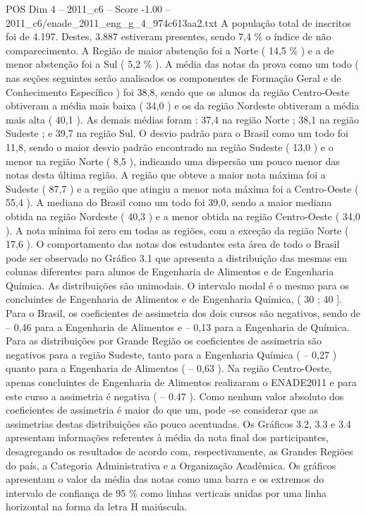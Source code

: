 \begin{textsample}{POS Dim 4 – 2011\_c6 – Score -1.00 – 2011\_c6/enade\_2011\_eng\_g\_4\_974c613aa2.txt}
A população total de inscritos foi de 4.197.
Destes, 3.887 estiveram presentes, sendo 7,4 \% o índice de não comparecimento.
A Região de maior abstenção foi a Norte ( 14,5 \% ) e a de menor abstenção foi a Sul ( 5,2 \% ).
A média das notas da prova como um todo ( nas seções seguintes serão analisados os componentes de Formação Geral e de Conhecimento Específico ) foi 38,8, sendo que os alunos da região Centro-Oeste obtiveram a média mais baixa ( 34,0 ) e os da região Nordeste obtiveram a média mais alta ( 40,1 ).
As demais médias foram : 37,4 na região Norte ; 38,1 na região Sudeste ; e 39,7 na região Sul.
O desvio padrão para o Brasil como um todo foi 11,8, sendo o maior desvio padrão encontrado na região Sudeste ( 13,0 ) e o menor na região Norte ( 8,5 ), indicando uma dispersão um pouco menor das notas desta última região.
A região que obteve a maior nota máxima foi a Sudeste ( 87,7 ) e a região que atingiu a menor nota máxima foi a Centro-Oeste ( 55,4 ).
A mediana do Brasil como um todo foi 39,0, sendo a maior mediana obtida na região Nordeste ( 40,3 ) e a menor obtida na região Centro-Oeste ( 34,0 ).
A nota mínima foi zero em todas as regiões, com a exceção da região Norte ( 17,6 ).
O comportamento das notas dos estudantes esta área de todo o Brasil pode ser observado no Gráfico 3.1 que apresenta a distribuição das mesmas em colunas diferentes para alunos de Engenharia de Alimentos e de Engenharia Química.
As distribuições são unimodais.
O intervalo modal é o mesmo para os concluintes de Engenharia de Alimentos e de Engenharia Química, ( 30 ; 40 ].
Para o Brasil, os coeficientes de assimetria dos dois cursos são negativos, sendo de – 0,46 para a Engenharia de Alimentos e – 0,13 para a Engenharia de Química.
Para as distribuições por Grande Região os coeficientes de assimetria são negativos para a região Sudeste, tanto para a Engenharia Química ( – 0,27 ) quanto para a Engenharia de Alimentos ( – 0,63 ).
Na região Centro-Oeste, apenas concluintes de Engenharia de Alimentos realizaram o ENADE2011 e para este curso a assimetria é negativa ( – 0.47 ).
Como nenhum valor absoluto dos coeficientes de assimetria é maior do que um, pode -se considerar que as assimetrias destas distribuições são pouco acentuadas.
Os Gráficos 3.2, 3.3 e 3.4 apresentam informações referentes à média da nota final dos participantes, desagregando os resultados de acordo com, respectivamente, as Grandes Regiões do país, a Categoria Administrativa e a Organização Acadêmica.
Os gráficos apresentam o valor da média das notas como uma barra e os extremos do intervalo de confiança de 95 \% como linhas verticais unidas por uma linha horizontal na forma da letra H maiúscula.

\end{textsample}

